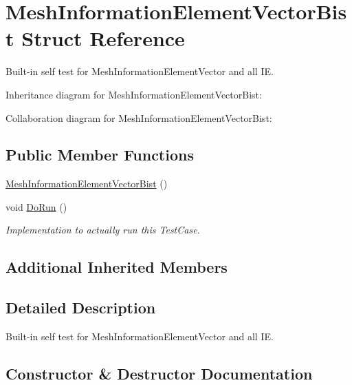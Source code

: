 \hypertarget{structMeshInformationElementVectorBist}{}\section{Mesh\+Information\+Element\+Vector\+Bist Struct Reference}
\label{structMeshInformationElementVectorBist}


Built-\/in self test for Mesh\+Information\+Element\+Vector and all IE.  




Inheritance diagram for Mesh\+Information\+Element\+Vector\+Bist\+:


Collaboration diagram for Mesh\+Information\+Element\+Vector\+Bist\+:
\subsection*{Public Member Functions}
\begin{DoxyCompactItemize}
\item 
\hyperlink{structMeshInformationElementVectorBist_ad701c74b3f5204fe463f6cdcd2c7cf71}{Mesh\+Information\+Element\+Vector\+Bist} ()
\item 
void \hyperlink{structMeshInformationElementVectorBist_a4d5c57e66ab8664f3d422c9547b7a84a}{Do\+Run} ()
\begin{DoxyCompactList}\small\item\em Implementation to actually run this Test\+Case. \end{DoxyCompactList}\end{DoxyCompactItemize}
\subsection*{Additional Inherited Members}


\subsection{Detailed Description}
Built-\/in self test for Mesh\+Information\+Element\+Vector and all IE. 

\subsection{Constructor \& Destructor Documentation}
